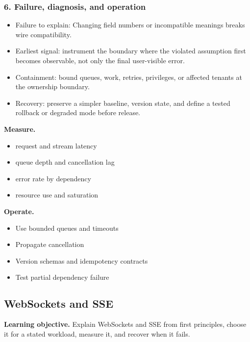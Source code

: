 \subsubsection*{6. Failure, diagnosis, and operation}
\begin{itemize}
\item Failure to explain: Changing field numbers or incompatible meanings breaks wire compatibility.
\item Earliest signal: instrument the boundary where the violated assumption first becomes observable, not only the final user-visible error.
\item Containment: bound queues, work, retries, privileges, or affected tenants at the ownership boundary.
\item Recovery: preserve a simpler baseline, version state, and define a tested rollback or degraded mode before release.
\end{itemize}
\textbf{Measure.}\begin{itemize}
\item request and stream latency
\item queue depth and cancellation lag
\item error rate by dependency
\item resource use and saturation
\end{itemize}
\textbf{Operate.}\begin{itemize}
\item Use bounded queues and timeouts
\item Propagate cancellation
\item Version schemas and idempotency contracts
\item Test partial dependency failure
\end{itemize}
\subsection{WebSockets and SSE}
\textbf{Learning objective.} Explain WebSockets and SSE from first principles, choose it for a stated workload, measure it, and recover when it fails.
